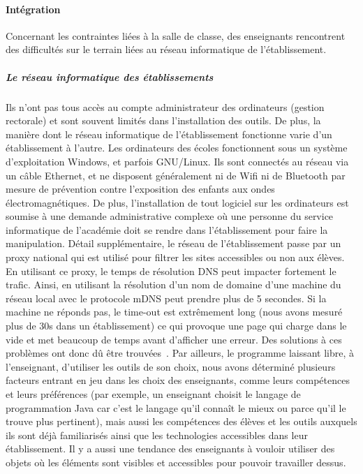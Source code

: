         \paragraph{Intégration}
            Concernant les contraintes liées à la salle de classe, des enseignants rencontrent des difficultés sur le terrain liées au réseau informatique de l'établissement.
            \subparagraph{Le réseau informatique des établissements}\label{sec:connect_classe}
                Ils n'ont pas tous accès au compte administrateur des ordinateurs (gestion rectorale) et sont souvent limités dans l'installation des outils. De plus, la manière dont le réseau informatique de l'établissement fonctionne varie d'un établissement à l'autre.
                Les ordinateurs des écoles fonctionnent sous un système d'exploitation Windows, et parfois GNU/Linux. Ils sont connectés au réseau via un câble Ethernet, et ne disposent généralement ni de Wifi ni de Bluetooth par mesure de prévention contre l'exposition des enfants aux ondes électromagnétiques. 
                De plus, l'installation de tout logiciel sur les ordinateurs est soumise à une demande administrative complexe où une personne du service informatique de l'académie doit se rendre dans l'établissement pour faire la manipulation.
                Détail supplémentaire, le réseau de l'établissement passe par un proxy national qui est utilisé pour filtrer les sites accessibles ou non aux élèves.
                En utilisant ce proxy, le temps de résolution DNS peut impacter fortement le trafic. Ainsi, en utilisant la résolution d'un nom de domaine d'une machine du réseau local avec le protocole mDNS peut prendre plus de 5 secondes.
                Si la machine ne réponds pas, le time-out est extrêmement long (nous avons mesuré plus de 30s dans un établissement) ce qui provoque une page qui charge dans le vide et met beaucoup de temps avant d'afficher une erreur. Des solutions à ces problèmes ont donc dû être trouvées~.
                Par ailleurs, le programme laissant libre, à l'enseignant, d'utiliser les outils de son choix, nous avons déterminé plusieurs facteurs entrant en jeu dans les choix des enseignants, comme leurs compétences et leurs préférences (par exemple, un enseignant choisit le langage de programmation Java car c'est le langage qu'il connaît le mieux ou parce qu'il le trouve plus pertinent), mais aussi les compétences des élèves et les outils auxquels ils sont déjà familiarisés  ainsi que les technologies accessibles dans leur établissement.
                Il y a aussi une tendance des enseignants à vouloir utiliser des objets où les éléments sont visibles et accessibles pour pouvoir travailler dessus.
